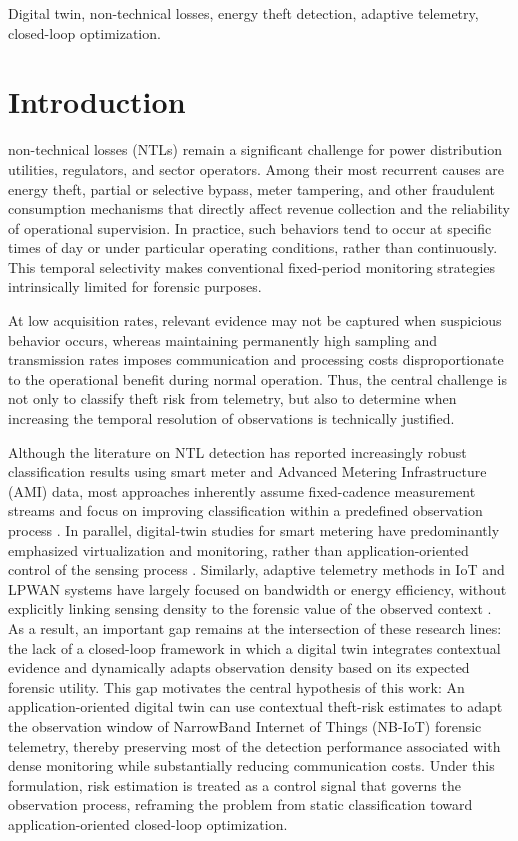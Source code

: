 \documentclass[journal]{IEEEtran}
\begin{document}
\begin{IEEEkeywords}
Digital twin, non-technical losses, energy theft detection, adaptive telemetry, closed-loop optimization.
\end{IEEEkeywords}

\section{Introduction}
 non-technical losses (NTLs) remain a significant challenge for power distribution utilities, regulators, and sector operators. Among their most recurrent causes are energy theft, partial or selective bypass, meter tampering, and other fraudulent consumption mechanisms that directly affect revenue collection and the reliability of operational supervision. In practice, such behaviors tend to occur at specific times of day or under particular operating conditions, rather than continuously. This temporal selectivity makes conventional fixed-period monitoring strategies intrinsically limited for forensic purposes.

At low acquisition rates, relevant evidence may not be captured when suspicious behavior occurs, whereas maintaining permanently high sampling and transmission rates imposes communication and processing costs disproportionate to the operational benefit during normal operation. Thus, the central challenge is not only to classify theft risk from telemetry, but also to determine when increasing the temporal resolution of observations is technically justified.

Although the literature on NTL detection has reported increasingly robust classification results using smart meter and Advanced Metering Infrastructure (AMI) data, most approaches inherently assume fixed-cadence measurement streams and focus on improving classification within a predefined observation process \cite{b2,b4,b5,b6}. In parallel, digital-twin studies for smart metering have predominantly emphasized virtualization and monitoring, rather than application-oriented control of the sensing process \cite{b19,b20,b22}. Similarly, adaptive telemetry methods in IoT and LPWAN systems have largely focused on bandwidth or energy efficiency, without explicitly linking sensing density to the forensic value of the observed context \cite{b26,b27,b29}. As a result, an important gap remains at the intersection of these research lines: the lack of a closed-loop framework in which a digital twin integrates contextual evidence and dynamically adapts observation density based on its expected forensic utility. This gap motivates the central hypothesis of this work: An application-oriented digital twin can use contextual theft-risk estimates to adapt the observation window of NarrowBand Internet of Things (NB-IoT) forensic telemetry, thereby preserving most of the detection performance associated with dense monitoring while substantially reducing communication costs. Under this formulation, risk estimation is treated as a control signal that governs the observation process, reframing the problem from static classification toward application-oriented closed-loop optimization.
\end{document}
